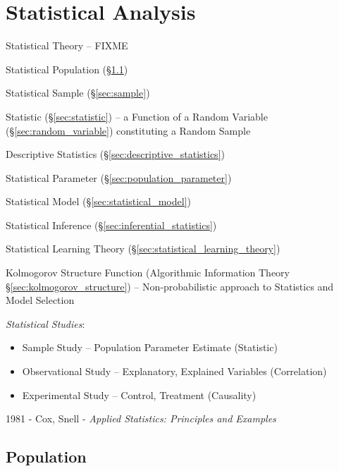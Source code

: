 \section{Statistical Analysis}\label{sec:statistical_analysis}

Statistical Theory -- FIXME

Statistical Population (\S\ref{sec:population})

Statistical Sample (\S\ref{sec:sample})

Statistic (\S\ref{sec:statistic}) -- a Function of a Random Variable
(\S\ref{sec:random_variable}) constituting a Random Sample

Descriptive Statistics (\S\ref{sec:descriptive_statistics})

Statistical Parameter (\S\ref{sec:population_parameter})

Statistical Model (\S\ref{sec:statistical_model})

Statistical Inference (\S\ref{sec:inferential_statistics})

Statistical Learning Theory (\S\ref{sec:statistical_learning_theory})

Kolmogorov Structure Function (Algorithmic Information Theory
\S\ref{sec:kolmogorov_structure}) -- Non-probabilistic approach to Statistics
and Model Selection

\emph{Statistical Studies}:
\begin{itemize}
  \item Sample Study -- Population Parameter Estimate (Statistic)
  \item Observational Study -- Explanatory, Explained Variables (Correlation)
  \item Experimental Study -- Control, Treatment (Causality)
\end{itemize}

1981 - Cox, Snell - \emph{Applied Statistics: Principles and Examples}



\subsection{Population}\label{sec:population}

